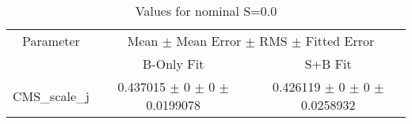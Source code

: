 \begin{table}
\centering
\caption{Values for nominal S=0.0}
\begin{tabular}{ccc}
\toprule
Parameter & \multicolumn{2}{c}{Mean $\pm$ Mean Error $\pm$ RMS $\pm$ Fitted Error}\\
 & B-Only Fit & S+B Fit\\
\midrule
CMS\_scale\_j & \num{0.437015} $\pm$ \num{0} $\pm$ \num{0} $\pm$ \num{0.0199078} & \num{0.426119} $\pm$ \num{0} $\pm$ \num{0} $\pm$ \num{0.0258932}\\
\bottomrule
\end{tabular}
\end{table}